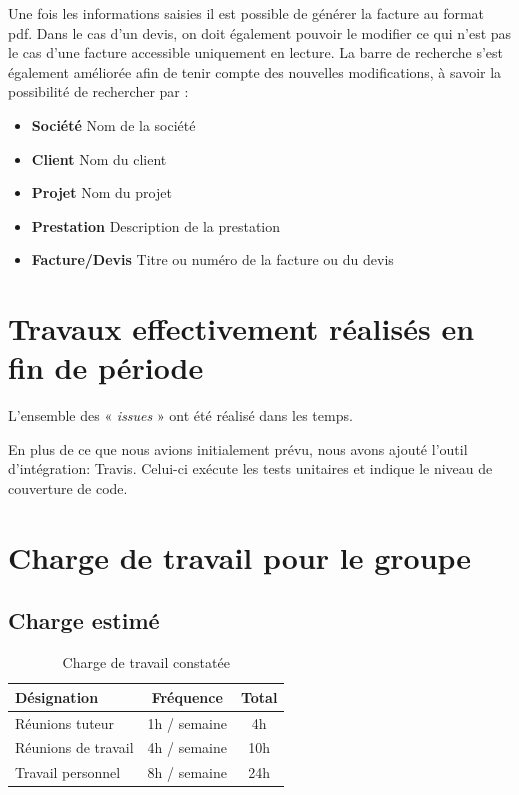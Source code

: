 \documentclass[12pt,a4paper,openany]{article}
\begin{document}
	Une fois les informations saisies il est possible de générer la facture au format pdf.
	Dans le cas d'un devis, on doit également pouvoir le modifier ce qui n'est pas le cas d'une facture accessible uniquement en lecture.
	La barre de recherche s'est également améliorée afin de tenir compte des nouvelles modifications, à savoir la possibilité de rechercher par : 
	\begin{itemize}
		\item \textbf{Société} Nom de la société
		\item \textbf{Client} Nom du client
		\item \textbf{Projet} Nom du projet
		\item \textbf{Prestation} Description de la prestation
		\item \textbf{Facture/Devis} Titre ou numéro de la facture ou du devis
	\end{itemize}  
	
	\section{Travaux effectivement réalisés en fin de période}
	L'ensemble des « \textit{issues} » ont été réalisé dans les temps. 

	En plus de ce que nous avions initialement prévu, nous avons ajouté l'outil d'intégration: Travis. Celui-ci exécute les tests unitaires et indique le niveau de couverture de code. 

	\section{Charge de travail pour le groupe}
	\subsection{Charge estimé}
	\begin{table}[H]
		\centering
		\begin{tabular}{l|c|c}
			\textbf{Désignation} & \textbf{Fréquence} & \textbf{Total}\\
			\hline
			Réunions tuteur & 1h / semaine & 4h\\
			Réunions de travail & 4h / semaine & 10h\\
			Travail personnel & 8h / semaine & 24h
		\end{tabular}
		\caption{Charge de travail constatée}
	\end{table}
\end{document}
